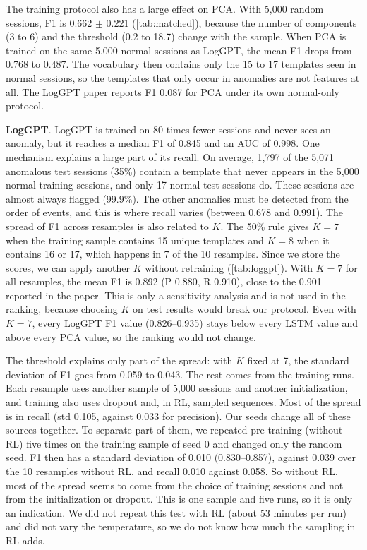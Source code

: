 \documentclass[10pt, conference]{IEEEtran}
\renewcommand{\paragraph}[1]{\noindent\textbf{#1}.}
\begin{document}
The training protocol also has a large effect on PCA. With 5,000 random sessions, F1 is 0.662 $\pm$ 0.221 (\cref{tab:matched}), because the number of components (3 to 6) and the threshold (0.2 to 18.7) change with the sample. When PCA is trained on the same 5,000 normal sessions as LogGPT, the mean F1 drops from 0.768 to 0.487. The vocabulary then contains only the 15 to 17 templates seen in normal sessions, so the templates that only occur in anomalies are not features at all. The LogGPT paper reports F1 0.087 for PCA under its own normal-only protocol.

\paragraph{LogGPT} LogGPT is trained on 80 times fewer sessions and never sees an anomaly, but it reaches a median F1 of 0.845 and an AUC of 0.998. One mechanism explains a large part of its recall. On average, 1,797 of the 5,071 anomalous test sessions (35\%) contain a template that never appears in the 5,000 normal training sessions, and only 17 normal test sessions do. These sessions are almost always flagged (99.9\%). The other anomalies must be detected from the order of events, and this is where recall varies (between 0.678 and 0.991). The spread of F1 across resamples is also related to $K$. The 50\% rule gives $K=7$ when the training sample contains 15 unique templates and $K=8$ when it contains 16 or 17, which happens in 7 of the 10 resamples. Since we store the scores, we can apply another $K$ without retraining (\cref{tab:loggpt}). With $K=7$ for all resamples, the mean F1 is 0.892 (P 0.880, R 0.910), close to the 0.901 reported in the paper. This is only a sensitivity analysis and is not used in the ranking, because choosing $K$ on test results would break our protocol. Even with $K=7$, every LogGPT F1 value (0.826--0.935) stays below every LSTM value and above every PCA value, so the ranking would not change.

The threshold explains only part of the spread: with $K$ fixed at 7, the standard deviation of F1 goes from 0.059 to 0.043. The rest comes from the training runs. Each resample uses another sample of 5,000 sessions and another initialization, and training also uses dropout and, in RL, sampled sequences. Most of the spread is in recall (std 0.105, against 0.033 for precision). Our seeds change all of these sources together. To separate part of them, we repeated pre-training (without RL) five times on the training sample of seed 0 and changed only the random seed. F1 then has a standard deviation of 0.010 (0.830--0.857), against 0.039 over the 10 resamples without RL, and recall 0.010 against 0.058. So without RL, most of the spread seems to come from the choice of training sessions and not from the initialization or dropout. This is one sample and five runs, so it is only an indication. We did not repeat this test with RL (about 53 minutes per run) and did not vary the temperature, so we do not know how much the sampling in RL adds.
\end{document}
